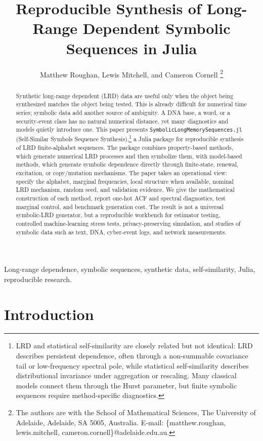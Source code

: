 \documentclass[journal]{IEEEtran}
\title{Reproducible Synthesis of Long-Range Dependent Symbolic Sequences in Julia}
\author{Matthew Roughan, Lewis Mitchell, and Cameron Cornell%
\thanks{The authors are with the School of Mathematical Sciences,
The University of Adelaide, Adelaide, SA 5005, Australia.
E-mail: \{matthew.roughan, lewis.mitchell, cameron.cornell\}@adelaide.edu.au.}}
\newcommand{\pkg}[1]{\texttt{#1}}
\newcommand{\sfive}{\pkg{SymbolicLongMemorySequences.jl}}
\begin{document}
\maketitle


\begin{abstract}
Synthetic long-range dependent (LRD) data are useful only when the object being
synthesized matches the object being tested.  This is already difficult for
numerical time series; symbolic data add another source of ambiguity.  A DNA
base, a word, or a security-event class has no natural numerical distance, yet many diagnostics and
models quietly introduce one.  This paper presents \sfive{} (Self-Similar Symbols
Sequence Synthesis),\footnote{LRD and statistical self-similarity are closely
related but not identical: LRD describes persistent dependence, often through a
non-summable covariance tail or low-frequency spectral pole, while statistical
self-similarity describes distributional invariance under aggregation or
rescaling. Many classical models connect them through the Hurst parameter, but
finite symbolic sequences require method-specific diagnostics.} a Julia package
for reproducible synthesis of LRD finite-alphabet sequences.  The package
combines property-based methods, which generate numerical LRD processes and then
symbolize them, with model-based methods, which generate symbolic dependence
directly through finite-state, renewal, excitation, or copy/mutation mechanisms.
The paper takes an operational view: specify the alphabet, marginal frequencies,
local structure when available, nominal LRD mechanism, random seed, and validation
evidence.  We give the mathematical construction of each method,
report one-hot ACF and spectral diagnostics, test marginal control, and benchmark
generation cost.  The result is not a universal symbolic-LRD generator, but a
reproducible workbench for estimator testing, controlled machine-learning stress
tests, privacy-preserving simulation, and studies of symbolic data such as text,
DNA, cyber-event logs, and network measurements.
\end{abstract}

\begin{IEEEkeywords}
Long-range dependence, symbolic sequences, synthetic data, self-similarity,
Julia, reproducible research.
\end{IEEEkeywords}


\section{Introduction}
\end{document}
